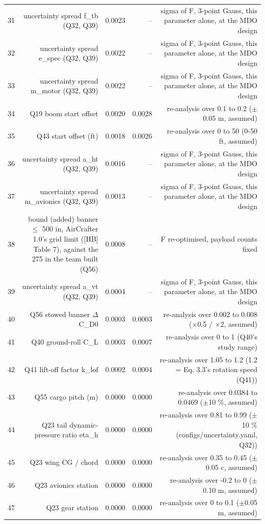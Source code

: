 \begin{table}[htbp]
{\begin{tabular}{lrrrr}
31 & uncertainty spread f\_tb (Q32, Q39) & 0.0023 & -- & sigma of F, 3-point Gauss, this parameter alone, at the MDO design \\
32 & uncertainty spread e\_spec (Q32, Q39) & 0.0022 & -- & sigma of F, 3-point Gauss, this parameter alone, at the MDO design \\
33 & uncertainty spread m\_motor (Q32, Q39) & 0.0022 & -- & sigma of F, 3-point Gauss, this parameter alone, at the MDO design \\
34 & Q19 boom start offset & 0.0020 & 0.0028 & re-analysis over 0.1 to 0.2 ($\pm$0.05 m, assumed) \\
35 & Q43 start offset (ft) & 0.0018 & 0.0026 & re-analysis over 0 to 50 (0-50 ft, assumed) \\
36 & uncertainty spread a\_ht (Q32, Q39) & 0.0016 & -- & sigma of F, 3-point Gauss, this parameter alone, at the MDO design \\
37 & uncertainty spread m\_avionics (Q32, Q39) & 0.0013 & -- & sigma of F, 3-point Gauss, this parameter alone, at the MDO design \\
38 & bound (added) banner $\leq$ 500 in, AirCrafter 1.0's grid limit ([HB] Table 7), against the 275 in the team built (Q56) & 0.0008 & -- & F re-optimised, payload counts fixed \\
39 & uncertainty spread a\_vt (Q32, Q39) & 0.0004 & -- & sigma of F, 3-point Gauss, this parameter alone, at the MDO design \\
40 & Q56 stowed banner $\Delta$C\_D0 & 0.0003 & 0.0003 & re-analysis over 0.002 to 0.008 ($\times$0.5 / $\times$2, assumed) \\
41 & Q40 ground-roll C\_L & 0.0003 & 0.0007 & re-analysis over 0 to 1 (Q40's study range) \\
42 & Q41 lift-off factor k\_lof & 0.0002 & 0.0004 & re-analysis over 1.05 to 1.2 (1.2 = Eq. 3.3's rotation speed (Q41)) \\
43 & Q55 cargo pitch (m) & 0.0000 & 0.0000 & re-analysis over 0.0384 to 0.0469 ($\pm$10 \%, assumed) \\
44 & Q23 tail dynamic-pressure ratio eta\_h & 0.0000 & 0.0000 & re-analysis over 0.81 to 0.99 ($\pm$10 \% (configs/uncertainty.yaml, Q32)) \\
45 & Q23 wing CG / chord & 0.0000 & 0.0000 & re-analysis over 0.35 to 0.45 ($\pm$0.05 c, assumed) \\
46 & Q23 avionics station & 0.0000 & 0.0000 & re-analysis over -0.2 to 0 ($\pm$0.10 m, assumed) \\
47 & Q23 gear station & 0.0000 & 0.0000 & re-analysis over 0 to 0.1 ($\pm$0.05 m, assumed) \\

\end{tabular}}
\end{table}
